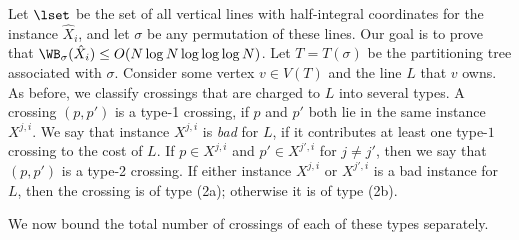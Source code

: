 Let $\lset$ be the set of all vertical lines with half-integral  coordinates for the instance $\hat X_i$, and let $\sigma$ be any permutation of these lines. Our goal is to prove that $\WB_{\sigma}(\hat X_i)\leq O(N\log N\log\log\log N)$. Let $T=T(\sigma)$ be the partitioning tree associated with $\sigma$. Consider some vertex $v\in V(T)$ and the line $L$ that $v$ owns. As before, we classify crossings that are charged to $L$ into several types. A crossing $(p,p')$ is a type-1 crossing, if $p$ and $p'$ both lie in the same instance $X^{j,i}$. We say that instance $X^{j,i}$ is \emph{bad} for $L$, if it contributes at least one type-$1$ crossing to the cost of $L$. If $p\in X^{j,i}$ and $p'\in X^{j',i}$ for $j\neq j'$, then we say that $(p,p')$ is a type-2 crossing. If either instance $X^{j,i}$ or $X^{j',i}$ is a bad instance for $L$, then the crossing is of type (2a); otherwise it is of type (2b). 

We now bound the total number of crossings of each of these types separately.

